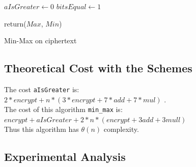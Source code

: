 \documentclass{acm_proc_article-sp}
\begin{document}

\linesnumbered

\begin{algorithm}[H]

\SetVline



 $aIsGreater \leftarrow 0$\;
 $bitsEqual \leftarrow 1$\;
	




return($Max$, $Min$)

 \caption{Min-Max on ciphertext \label{Code:algo}}


\end{algorithm}


\subsection{Theoretical Cost with the Schemes}

The cost \texttt{aIsGreater} is:\\
 $2*encrypt+n*(3*encrypt+7*add+7*mul)$ .\\
The cost of this algorithm \texttt{min\_max} is:\\
$ encrypt+aIsGreater+2*n*(encrypt+3add+3mull)$\\
Thus this algorithm has $\theta(n)$ complexity. 

\subsection{Experimental Analysis}
\end{document}

